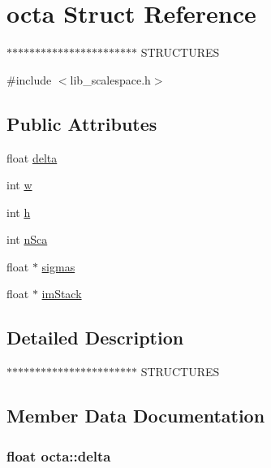 \hypertarget{structocta}{}\section{octa Struct Reference}
\label{structocta}


$\ast$$\ast$$\ast$$\ast$$\ast$$\ast$$\ast$$\ast$$\ast$$\ast$$\ast$$\ast$$\ast$$\ast$$\ast$$\ast$$\ast$$\ast$$\ast$$\ast$$\ast$$\ast$$\ast$ S\+T\+R\+U\+C\+T\+U\+R\+E\+S  




{\ttfamily \#include $<$lib\+\_\+scalespace.\+h$>$}

\subsection*{Public Attributes}
\begin{DoxyCompactItemize}
\item 
float \hyperlink{structocta_a766e49261e948f1e53b527094657ae88}{delta}
\item 
int \hyperlink{structocta_a8071dcf78cffd87b55e8c9f1575f5e08}{w}
\item 
int \hyperlink{structocta_a1bc350b403959f01b9457807e855da81}{h}
\item 
int \hyperlink{structocta_ae0d1f771d2fd9f098e46cdac8752a9b0}{n\+Sca}
\item 
float $\ast$ \hyperlink{structocta_aceae2720d5e95a242158513e8f1b9f46}{sigmas}
\item 
float $\ast$ \hyperlink{structocta_a2902cb4a937cc56fd61308e36f4f445b}{im\+Stack}
\end{DoxyCompactItemize}


\subsection{Detailed Description}
$\ast$$\ast$$\ast$$\ast$$\ast$$\ast$$\ast$$\ast$$\ast$$\ast$$\ast$$\ast$$\ast$$\ast$$\ast$$\ast$$\ast$$\ast$$\ast$$\ast$$\ast$$\ast$$\ast$ S\+T\+R\+U\+C\+T\+U\+R\+E\+S 

\subsection{Member Data Documentation}
\hypertarget{structocta_a766e49261e948f1e53b527094657ae88}{}
\subsubsection[{delta}]{\setlength{\rightskip}{0pt plus 5cm}float octa\+::delta}\label{structocta_a766e49261e948f1e53b527094657ae88}
\hypertarget{structocta_a1bc350b403959f01b9457807e855da81}{}
